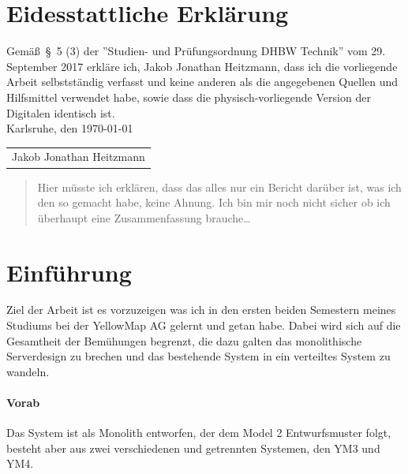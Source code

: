 \documentclass[12pt,a4paper]{article}
\begin{document}

\section*{Eidesstattliche Erkl\"arung}

Gem\"a\ss\ \S\ 5 (3) der ''Studien- und Pr\"ufungsordnung DHBW Technik'' vom 29. September 2017 erkl\"are ich, Jakob Jonathan Heitzmann, dass ich die vorliegende Arbeit selbstst\"andig verfasst und keine anderen als die angegebenen Quellen und Hilfsmittel verwendet habe, sowie dass die physisch-vorliegende Version der Digitalen identisch ist.\\
\hspace*{0.5cm}
Karlsruhe, den \today

\vspace*{2cm}

\begin{tabular}{@{}l@{}}\hline
\rule{0pt}{2ex}
Jakob Jonathan Heitzmann
\end{tabular}
\newpage


\begin{abstract}
Hier müsste ich erklären, dass das alles nur ein Bericht darüber ist, was ich den so gemacht habe, keine Ahnung. Ich bin mir noch nicht sicher ob ich überhaupt eine Zusammenfassung brauche\ldots
\end{abstract}
\newpage

\tableofcontents
\newpage


\section{Einf\"uhrung}
Ziel der Arbeit ist es vorzuzeigen was ich in den ersten beiden Semestern meines Studiums bei der YellowMap AG gelernt und getan habe. Dabei wird sich auf die Gesamtheit der Bemühungen begrenzt, die dazu galten das monolithische Serverdesign zu brechen und das bestehende System in ein verteiltes System zu wandeln.

\paragraph{Vorab}
Das System ist als Monolith entworfen, der dem Model 2 Entwurfsmuster folgt, besteht aber aus zwei verschiedenen und getrennten Systemen, den YM3 und YM4.
\end{document}
